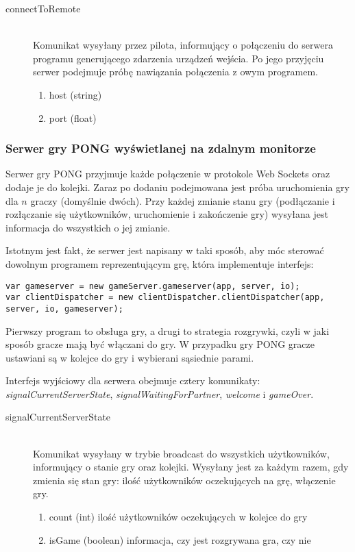 \begin{description}
	\item[connectToRemote] \hfill \\
	Komunikat wysyłany przez pilota, informujący o połączeniu do serwera programu generującego zdarzenia urządzeń wejścia. Po jego przyjęciu serwer podejmuje próbę nawiązania połączenia z owym programem.
	\begin{enumerate}
		\item host (string)
		\item port (float)
	\end{enumerate}
\end{description}


\subsubsection{Serwer gry PONG wyświetlanej na zdalnym monitorze}

Serwer gry PONG przyjmuje każde połączenie w protokole Web Sockets oraz dodaje je do kolejki. Zaraz po dodaniu podejmowana jest próba uruchomienia gry dla \(n\) graczy (domyślnie dwóch). Przy każdej zmianie stanu gry (podłączanie i rozłączanie się użytkowników, uruchomienie i zakończenie gry) wysyłana jest informacja do wszystkich o jej zmianie.

Istotnym jest fakt, że serwer jest napisany w taki sposób, aby móc sterować dowolnym programem reprezentującym grę, która implementuje interfejs:

\lstset{language=JavaScript}
\begin{lstlisting}
var gameserver = new gameServer.gameserver(app, server, io);
var clientDispatcher = new clientDispatcher.clientDispatcher(app, server, io, gameserver);
\end{lstlisting}

Pierwszy program to obsługa gry, a drugi to strategia rozgrywki, czyli w jaki sposób gracze mają być włączani do gry. W przypadku gry PONG gracze ustawiani są w kolejce do gry i wybierani sąsiednie parami.

Interfejs wyjściowy dla serwera obejmuje cztery komunikaty: \emph{signalCurrentServerState}, \emph{signalWaitingForPartner}, \emph{welcome} i \emph{gameOver}.

\begin{description}
	\item[signalCurrentServerState] \hfill \\
	Komunikat wysyłany w trybie broadcast do wszystkich użytkowników, informujący o stanie gry oraz kolejki. Wysyłany jest za każdym razem, gdy zmienia się stan gry: ilość użytkowników oczekujących na grę, włączenie gry.
	\begin{enumerate}
		\item count (int) ilość użytkowników oczekujących w kolejce do gry
		\item isGame (boolean) informacja, czy jest rozgrywana gra, czy nie
	\end{enumerate}
\end{description}

